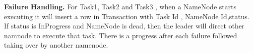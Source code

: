 \textbf{Failure Handling.}
For Task1, Task2 and Task3 , when a NameNode starts executing it will insert a row in Transaction with Task Id , NameNode Id,status. If status is InProgress and NameNode is dead, then the leader will direct other namnode to execute that task. There is a progress after each failure followed taking over by another namenode.









